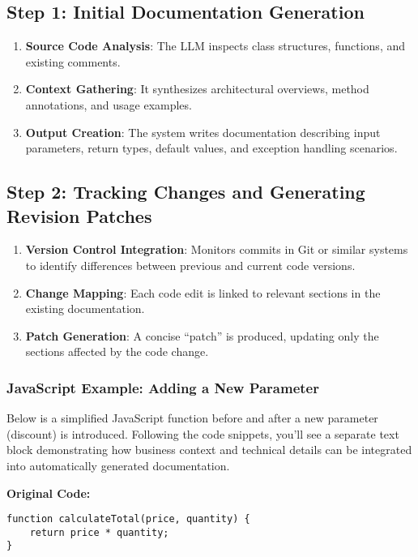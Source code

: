\documentclass[12pt,oneside]{article}
\begin{document}
\subsection{Step 1: Initial Documentation Generation}
\begin{enumerate}
  \item \textbf{Source Code Analysis}: The LLM inspects class structures, functions, and existing comments.
  \item \textbf{Context Gathering}: It synthesizes architectural overviews, method annotations, and usage examples.
  \item \textbf{Output Creation}: The system writes documentation describing input parameters, return types, default values, and exception handling scenarios.
\end{enumerate}

\subsection{Step 2: Tracking Changes and Generating Revision Patches}
\begin{enumerate}
  \item \textbf{Version Control Integration}: Monitors commits in Git or similar systems to identify differences between previous and current code versions.
  \item \textbf{Change Mapping}: Each code edit is linked to relevant sections in the existing documentation.
  \item \textbf{Patch Generation}: A concise “patch” is produced, updating only the sections affected by the code change.
\end{enumerate}

\subsubsection{JavaScript Example: Adding a New Parameter}
Below is a simplified JavaScript function before and after a new parameter (discount) is introduced. 
Following the code snippets, you’ll see a separate text block demonstrating how business context and technical 
details can be integrated into automatically generated documentation.

\noindent\textbf{Original Code:}
\begin{verbatim}
function calculateTotal(price, quantity) {
    return price * quantity;
}
\end{verbatim}
\end{document}
